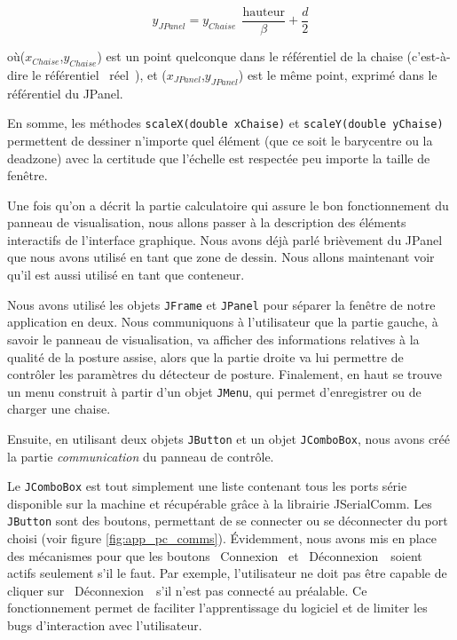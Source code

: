 \documentclass{polytech/polytech}
\begin{document}
\begin{equation}
\label{eqn:form_ref_vert}
y_{JPanel} = y_{Chaise}\ \ \frac{\mathrm{hauteur}}{\beta} + \frac{d}{2}
\end{equation}

où($x_{Chaise}$,$y_{Chaise}$) est un point quelconque dans le référentiel de la chaise (c'est-à-dire le référentiel \guillemotleft ~réel~\guillemotright ), et ($x_{JPanel}$,$y_{JPanel}$) est le même point, exprimé dans le référentiel du JPanel.

En somme, les méthodes \texttt{scaleX(double xChaise)} et \texttt{scaleY(double yChaise)} permettent de dessiner n'importe quel élément (que ce soit le barycentre ou la deadzone) avec la certitude que l'échelle est respectée peu importe la taille de fenêtre.

Une fois qu'on a décrit la partie calculatoire qui assure le bon fonctionnement du panneau de visualisation, nous allons passer à la description des éléments interactifs de l'interface graphique. 
Nous avons déjà parlé brièvement du JPanel que nous avons utilisé en tant que zone de dessin. Nous allons maintenant voir qu'il est aussi utilisé en tant que conteneur.

Nous avons utilisé les objets \texttt{JFrame} et \texttt{JPanel} pour séparer la fenêtre de notre application en deux.
Nous communiquons à l'utilisateur que la partie gauche, à savoir le panneau de visualisation, va afficher des informations relatives à la qualité de la posture assise, alors que la partie droite va lui permettre de contrôler les paramètres du détecteur de posture.
 Finalement, en haut se trouve un menu construit à partir d'un objet \texttt{JMenu}, qui permet d'enregistrer ou de charger une chaise.

Ensuite, en utilisant deux objets \texttt{JButton} et un objet \texttt{JComboBox}, nous avons créé la partie \textit{communication} du panneau de contrôle.

 Le \texttt{JComboBox} est tout simplement une liste contenant tous les ports série disponible sur la machine et récupérable grâce à la librairie JSerialComm.
Les \texttt{JButton} sont des boutons, permettant de se connecter ou se déconnecter du port choisi (voir figure \ref{fig:app_pc_comms}). Évidemment, nous avons mis en place des mécanismes pour que les boutons \guillemotleft ~Connexion \guillemotright\ et \guillemotleft\ Déconnexion~\guillemotright\ soient actifs seulement s'il le faut.
Par exemple, l'utilisateur ne doit pas être capable de cliquer sur \guillemotleft ~Déconnexion~\guillemotright\ s'il n'est pas connecté au préalable. 
Ce fonctionnement permet de faciliter l'apprentissage du logiciel et de limiter les bugs d'interaction avec l'utilisateur.
\end{document}
